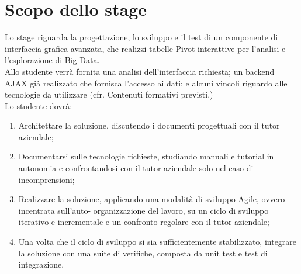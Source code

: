 \section*{Scopo dello stage}
Lo stage riguarda la progettazione, lo sviluppo e il test di un componente di interfaccia grafica avanzata, che realizzi tabelle Pivot interattive per l'analisi e l'esplorazione di Big Data. \\
Allo studente verrà fornita una analisi dell'interfaccia richiesta; un backend AJAX già realizzato che fornisca l'accesso ai dati; e alcuni vincoli riguardo alle tecnologie da utilizzare (cfr. Contenuti formativi previsti.) \\
Lo studente dovrà:
\begin{enumerate}
	\item Architettare la soluzione, discutendo i documenti progettuali con il tutor aziendale;
	\item Documentarsi sulle tecnologie richieste, studiando manuali e tutorial in autonomia e confrontandosi con il tutor aziendale solo nel caso di incomprensioni;
	\item Realizzare la soluzione, applicando una modalità di sviluppo Agile, ovvero incentrata sull'auto- organizzazione del lavoro, su un ciclo di sviluppo iterativo e incrementale e un confronto regolare con il tutor aziendale;
	\item Una volta che il ciclo di sviluppo si sia sufficientemente stabilizzato, integrare la soluzione con una suite di verifiche, composta da unit test e test di integrazione.
\end{enumerate}

